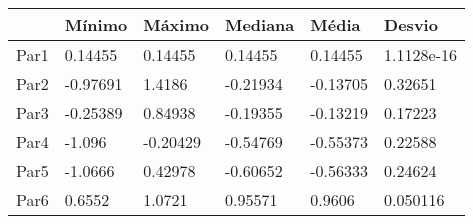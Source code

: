 \begin{tabular}{llllll}
& Mínimo & Máximo & Mediana & Média & Desvio \\ 
\hline 
Par1 & 0.14455 & 0.14455 & 0.14455 & 0.14455 & 1.1128e-16 \\ 
Par2 & -0.97691 & 1.4186 & -0.21934 & -0.13705 & 0.32651 \\ 
Par3 & -0.25389 & 0.84938 & -0.19355 & -0.13219 & 0.17223 \\ 
Par4 & -1.096 & -0.20429 & -0.54769 & -0.55373 & 0.22588 \\ 
Par5 & -1.0666 & 0.42978 & -0.60652 & -0.56333 & 0.24624 \\ 
Par6 & 0.6552 & 1.0721 & 0.95571 & 0.9606 & 0.050116 \\ 
\hline 
\end{tabular}